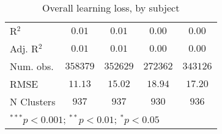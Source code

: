 \begin{table}
\begin{center}
\begin{tabular}{l c c c c}
\hline
R$^2$                     & $0.01$        & $0.01$        & $0.00$        & $0.00$        \\
Adj. R$^2$                & $0.01$        & $0.01$        & $0.00$        & $0.00$        \\
Num. obs.                 & $358379$      & $352629$      & $272362$      & $343126$      \\
RMSE                      & $11.13$       & $15.02$       & $18.94$       & $17.20$       \\
N Clusters                & $937$         & $937$         & $930$         & $936$         \\
\hline
\multicolumn{5}{l}{\scriptsize{$^{***}p<0.001$; $^{**}p<0.01$; $^{*}p<0.05$}}
\end{tabular}
\caption{Overall learning loss, by subject}
\label{table:overall}
\end{center}
\end{table}
